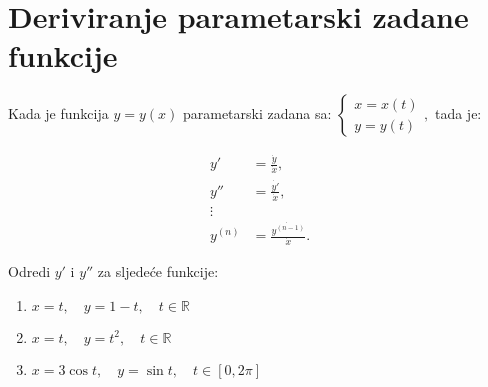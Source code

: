 \section{Deriviranje parametarski zadane funkcije}

Kada je funkcija $y=y(x)$ parametarski zadana sa: $\displaystyle
\begin{cases}
    x = x(t)\\
    y = y(t)
\end{cases},
$ tada je:

\begin{align*}
y'&=\frac{\dot{y}}{\dot{x}},\\
y''&=\frac{\dot{y'}}{\dot{x}},\\
\vdots&\\
y^{(n)}&=\frac{\dot{y^{(n-1)}}}{\dot{x}}.
\end{align*}

\begin{examplebox}
    Odredi $y'$ i $y''$ za sljedeće funkcije:

    \begin{enumerate}
        \item $x=t,\quad y=1-t,\quad t\in\mathbb{R}$
        \item $x=t,\quad y=t^2,\quad t\in\mathbb{R}$
        \item $x=3\cos t,\quad y=\sin t,\quad t\in[0, 2\pi]$
    \end{enumerate}
\end{examplebox}